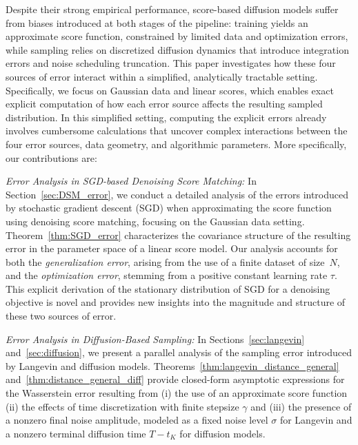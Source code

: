 \documentclass[11pt]{article}
\begin{document}
Despite their strong empirical performance, score-based diffusion models suffer from biases introduced at both stages of the pipeline: training yields an approximate score function, constrained by limited data and optimization errors, while sampling relies on discretized diffusion dynamics that introduce integration errors and noise scheduling truncation.
This paper investigates how these four sources of error interact within a simplified, analytically tractable setting.
Specifically, we focus on Gaussian data and linear scores, which enables exact explicit computation of how each error source affects the resulting sampled distribution.
In this simplified setting, computing the explicit errors already involves cumbersome calculations that uncover complex interactions between the four error sources, data geometry, and algorithmic parameters.
More specifically, our contributions are:

\noindent\textit{Error Analysis in SGD-based Denoising Score Matching:}  
   In Section~\ref{sec:DSM_error}, we conduct a detailed analysis of the errors introduced by stochastic gradient descent (SGD) when approximating the score function using denoising score matching, focusing on the Gaussian data setting. Theorem~\ref{thm:SGD_error} characterizes the covariance structure of the resulting error in the parameter space of a linear score model. Our analysis accounts for both the \emph{generalization error}, arising from the use of a finite dataset of size~$N$, and the \emph{optimization error}, stemming from a positive constant learning rate $\tau$. This explicit derivation of the stationary distribution of SGD for a denoising objective is novel and provides new insights into the magnitude and structure of these two sources of error.

\noindent\textit{Error Analysis in Diffusion-Based Sampling:}  
    In Sections~\ref{sec:langevin} and~\ref{sec:diffusion}, we present a parallel analysis of the sampling error introduced by Langevin and diffusion models. Theorems~\ref{thm:langevin_distance_general} and~\ref{thm:distance_general_diff} provide closed-form asymptotic expressions for the Wasserstein error resulting from (i) the use of an approximate score function (ii) the effects of time discretization with finite stepsize $\gamma$ and (iii) the presence of a nonzero final noise amplitude, modeled as a fixed noise level $\sigma$ for Langevin and a nonzero terminal diffusion time $T-t_K$ for diffusion models.
    
\end{document}
